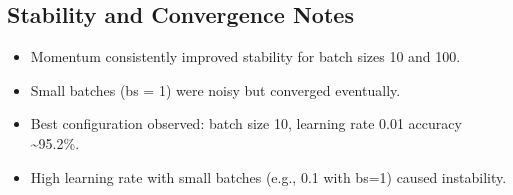 \documentclass[11pt]{article}
\begin{document}
\subsection{Stability and Convergence Notes}
\begin{itemize}
  \item Momentum consistently improved stability for batch sizes 10 and 100.
  \item Small batches (bs = 1) were noisy but converged eventually.
  \item Best configuration observed: batch size 10, learning rate 0.01 \rightarrow accuracy \textasciitilde 95.2\%.
  \item High learning rate with small batches (e.g., 0.1 with bs=1) caused instability.
\end{itemize}
\end{document}
